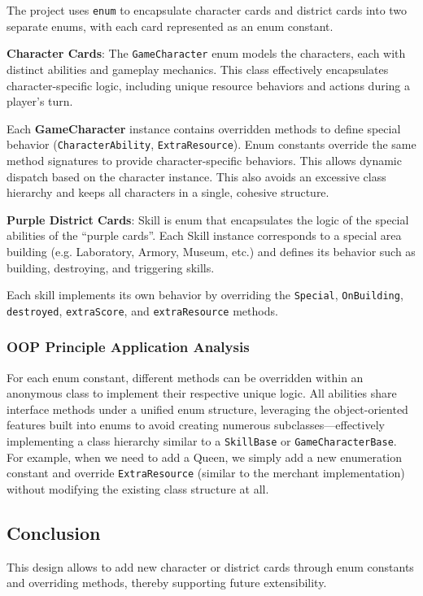 \documentclass[12pt]{article}
\begin{document}
The project uses \texttt{enum} to encapsulate character cards and district cards into two separate enums, with each card represented as an enum constant.

\textbf{Character Cards}: The \texttt{GameCharacter} enum models the characters, each with distinct abilities and gameplay mechanics. This class effectively encapsulates character-specific logic, including unique resource behaviors and actions during a player's turn.

Each \textbf{GameCharacter} instance contains overridden methods to define special behavior (\texttt{CharacterAbility}, \texttt{ExtraResource}). Enum constants override the same method signatures to provide character-specific behaviors. This allows dynamic dispatch based on the character instance. This also avoids an excessive class hierarchy and keeps all characters in a single, cohesive structure.


\textbf{Purple District Cards}: Skill is enum that encapsulates the logic of the special abilities of the “purple cards”. Each Skill instance corresponds to a special area building (e.g. Laboratory, Armory, Museum, etc.) and defines its behavior such as building, destroying, and triggering skills.

Each skill implements its own behavior by overriding the \texttt{Special}, \texttt{OnBuilding}, \texttt{destroyed}, \texttt{extraScore}, and \texttt{extraResource} methods.

\subsubsection*{OOP Principle Application Analysis}

For each enum constant, different methods can be overridden within an anonymous class to implement their respective unique logic. All abilities share interface methods under a unified enum structure, leveraging the object-oriented features built into enums to avoid creating numerous subclasses—effectively implementing a class hierarchy similar to a \texttt{SkillBase} or \texttt{GameCharacterBase}. For example, when we need to add a Queen, we simply add a new enumeration constant and override \texttt{ExtraResource} (similar to the merchant implementation) without modifying the existing class structure at all.

\subsection*{Conclusion}

This design allows to add new character or district cards through enum constants and overriding methods, thereby supporting future extensibility.
\end{document}
